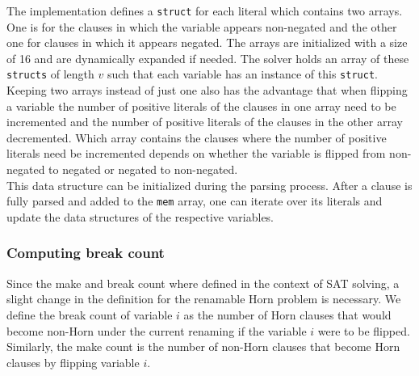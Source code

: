 \documentclass[12pt,a4paper]{article}
\begin{document}
The implementation defines a \texttt{struct} for each literal which contains two arrays. One is for the clauses in which the variable appears non-negated and the other one for clauses in which it appears negated. The arrays are initialized with a size of 16 and are dynamically expanded if needed. The solver holds an array of these \texttt{structs} of length $v$ such that each variable has an instance of this \texttt{struct}.\\
Keeping two arrays instead of just one also has the advantage that when flipping a variable the number of positive literals of the clauses in one array need to be incremented and the number of positive literals of the clauses in the other array decremented. Which array contains the clauses where the number of positive literals need be incremented depends on whether the variable is flipped from non-negated to negated or negated to non-negated.\\
This data structure can be initialized during the parsing process. After a clause is fully parsed and added to the \texttt{mem} array, one can iterate over its literals and update the data structures of the respective variables.

\subsubsection{Computing break count}
Since the make and break count where defined in the context of SAT solving, a slight change in the definition for the renamable Horn problem is necessary. We define the break count of variable $i$ as the number of Horn clauses that would become non-Horn under the current renaming if the variable $i$ were to be flipped. Similarly, the make count is the number of non-Horn clauses that become Horn clauses by flipping variable $i$.\\
\end{document}
